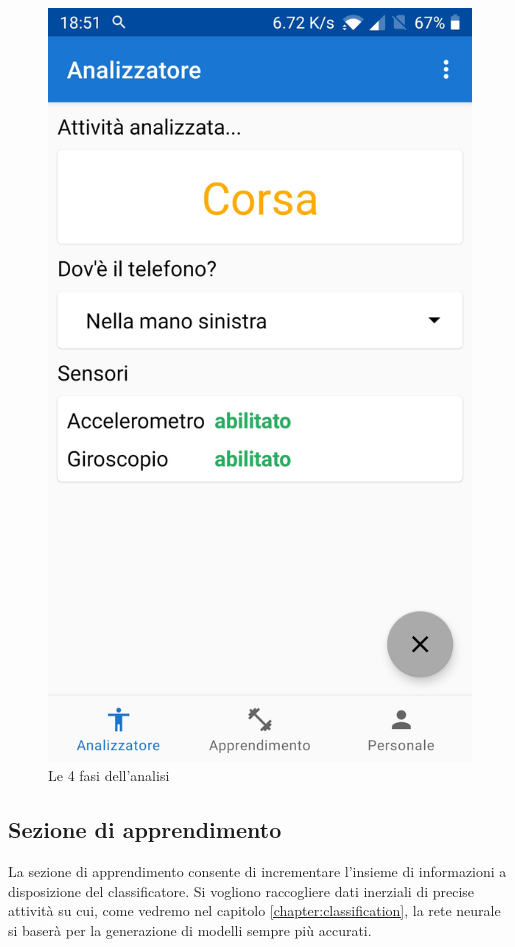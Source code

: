 \begin{figure}[H]
    \includegraphics[scale = 0.1019]{assets/images/screenshots/1d_Prediction.jpg}
    \caption{Le 4 fasi dell'analisi}
    \label{fig:screenshots_analysis}
\end{figure}


\subsection{Sezione di apprendimento}
La sezione di apprendimento consente di incrementare l'insieme di informazioni a disposizione del classificatore. 
Si vogliono raccogliere dati inerziali di precise attività su cui, come vedremo nel capitolo \ref{chapter:classification}, la rete neurale si baserà per 
la generazione di modelli sempre più accurati.

